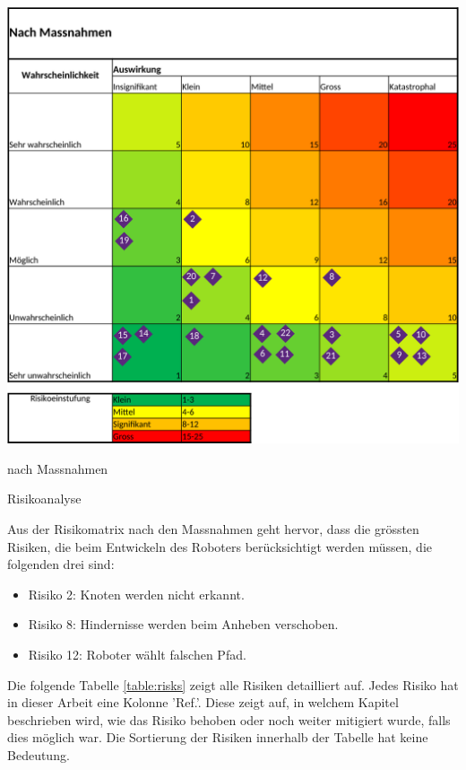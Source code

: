 \begin{table}[H]
\begin{subtable}{0.49\textwidth}
\includegraphics[width=0.99\linewidth]{assets/projektmanagement/Risikoanalyse_nachher-crop.pdf}
\caption{nach Massnahmen}
\label{table:risk-after}
\end{subtable}
\caption{Risikoanalyse}
\label{table:risk-table}
\end{table}

Aus der Risikomatrix nach den Massnahmen geht hervor, dass die grössten Risiken, die beim Entwickeln des Roboters berücksichtigt werden müssen, die folgenden drei sind:

\begin{itemize}
    \item Risiko 2: Knoten werden nicht erkannt.
    \item Risiko 8: Hindernisse werden beim Anheben verschoben.
    \item Risiko 12: Roboter wählt falschen Pfad.
\end{itemize}

Die folgende Tabelle \ref{table:risks} zeigt alle Risiken detailliert auf.  Jedes Risiko hat in dieser Arbeit eine Kolonne 'Ref.'. Diese zeigt auf, in welchem Kapitel beschrieben wird, wie das Risiko behoben oder noch weiter mitigiert wurde, falls dies möglich war. Die Sortierung der Risiken innerhalb der Tabelle hat keine Bedeutung.

